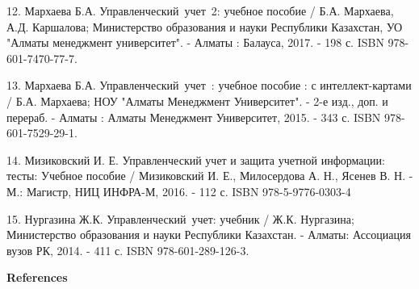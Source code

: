 \begin{references}
12. Мархаева Б.А. Управленческий~учет~2: учебное пособие / Б.А.
Мархаева, А.Д. Каршалова; Министерство образования и науки Республики
Казахстан, УО "Алматы менеджмент университет". - Алматы : Балауса, 2017.
- 198 с. ISBN 978-601-7470-77-7.

13. Мархаева Б.А. Управленческий~учет~: учебное пособие : с
интеллект-картами / Б.А. Мархаева; НОУ "Алматы Менеджмент Университет".
- 2-е изд., доп. и перераб. - Алматы : Алматы Менеджмент Университет,
2015. - 343 с. ISBN 978-601-7529-29-1.~

14. Мизиковский И. Е. Управленческий учет и защита учетной информации:
тесты: Учебное пособие / Мизиковский И. Е., Милосердова А. Н., Ясенев В.
Н. - М.: Магистр, НИЦ ИНФРА-М, 2016. - 112 с. ISBN 978-5-9776-0303-4

15. Нургазина Ж.К. Управленческий~учет: учебник / Ж.К. Нургазина;
Министерство образования и науки Республики Казахстан. - Алматы:
Ассоциация вузов РК, 2014. - 411 с. ISBN 978-601-289-126-3.

\end{references}

\begin{center}
{\bfseries References}
\end{center}


